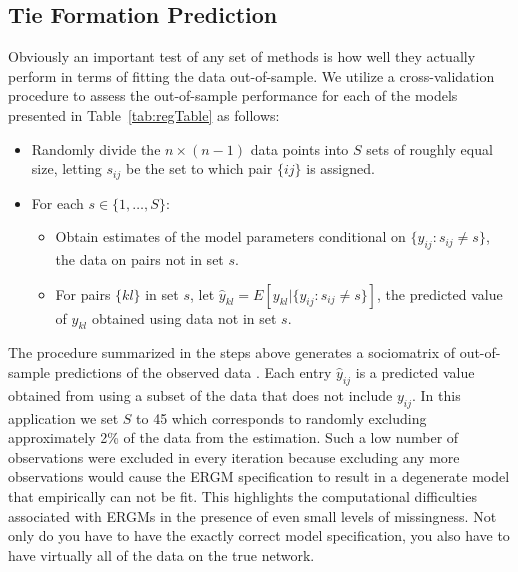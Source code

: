 \documentclass[12pt,onesided,pdflatex]{amsart}
\begin{document}
\subsection{Tie Formation Prediction}

Obviously an important test of any set of methods is how well they actually perform in terms of fitting the data out-of-sample. We utilize a cross-validation procedure to assess the out-of-sample performance for each of the models presented in Table~\ref{tab:regTable} as follows:

\begin{itemize}
	\item Randomly divide the $n \times (n-1)$ data points into $S$ sets of roughly equal size, letting $s_{ij}$ be the set to which pair $\{ij\}$ is assigned.
	\item For each $s \in \{1, \ldots, S\}$:
	\begin{itemize}
		\item Obtain estimates of the model parameters conditional on $\{y_{ij} : s_{ij} \neq s\}$, the data on pairs not in set $s$.
		\item For pairs $\{kl\}$ in set $s$, let $\hat y_{kl} = E[y_{kl} | \{y_{ij} : s_{ij} \neq s\}]$, the predicted value of $y_{kl}$ obtained using data not in set $s$.
	\end{itemize}
\end{itemize}

The procedure summarized in the steps above generates a sociomatrix of out-of-sample predictions of the observed data \citep{hoff:2008}. Each entry $\hat y_{ij}$ is a predicted value obtained from using a subset of the data that does not include $y_{ij}$. In this application we set $S$ to 45 which corresponds to randomly excluding approximately 2\% of the data from the estimation. Such a low number of observations were excluded in every iteration because excluding any more observations would cause the ERGM specification to result in a degenerate model that empirically can not be fit. This highlights the computational difficulties associated with ERGMs in the presence of even small levels of missingness.  Not only do you have to have the exactly
correct model specification, you also have to have virtually all of the data on the true network.
\end{document}
